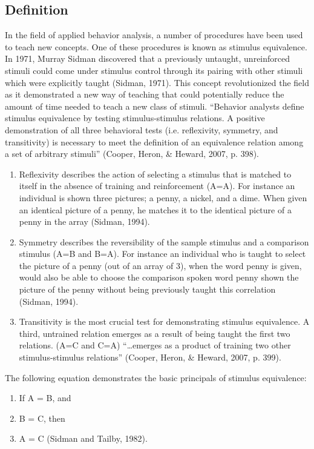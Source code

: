 \subsection{Definition}
In the field of applied behavior analysis, a number of procedures have been used to teach new concepts.  One of these procedures is known as stimulus equivalence.  In 1971, Murray Sidman discovered that a previously untaught, unreinforced stimuli could come under stimulus control through its pairing with other stimuli which were explicitly taught (Sidman, 1971). This concept revolutionized the field as it demonstrated a new way of teaching that could potentially reduce the amount of time needed to teach a new class of stimuli.   ``Behavior analysts define stimulus equivalence by testing stimulus-stimulus relations.  A positive demonstration of all three behavioral tests (i.e. reflexivity, symmetry, and transitivity) is necessary to meet the definition of an equivalence relation among a set of arbitrary stimuli'' (Cooper, Heron, \& Heward, 2007, p. 398). 
\begin{enumerate}
\item Reflexivity describes the action of selecting a stimulus that is matched to itself in the absence of training and reinforcement (A=A).  For instance an individual is shown three pictures; a penny, a nickel, and a dime.  When given an identical picture of a penny, he matches it to the identical picture of a penny in the array (Sidman, 1994).
\item Symmetry describes the reversibility of the sample stimulus and a comparison stimulus (A=B and B=A).  For instance an individual who is taught to select the picture of a penny (out of an array of 3), when the word penny is given, would also be able to choose the comparison spoken word penny shown the picture of the penny without being previously taught this correlation (Sidman, 1994).  
\item Transitivity is the most crucial test for demonstrating stimulus equivalence.  A third, untrained relation emerges as a result of being taught the first two relations.  (A=C and C=A) ``…emerges as a product of training two other stimulus-stimulus relations'' (Cooper, Heron, \& Heward, 2007, p. 399).  
\end{enumerate}

The following equation demonstrates the basic principals of stimulus equivalence:
\begin{enumerate}
\item If A = B, and
\item B = C, then
\item  A = C (Sidman and Tailby, 1982).
\end{enumerate}

